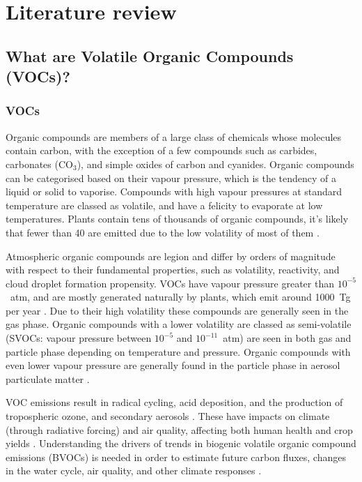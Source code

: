 
\chapter{Literature review} %
\label{ch_LitRev}

\section{What are Volatile Organic Compounds (VOCs)?}
\label{ch_LitRev:sec:what_are_vocs}
  \subsection{VOCs}
    Organic compounds are members of a large class of chemicals whose molecules contain carbon, with the exception of a few compounds such as carbides, carbonates (CO$_3$), and simple oxides of carbon and cyanides.
    Organic compounds can be categorised based on their vapour pressure, which is the tendency of a liquid or solid to vaporise.
    Compounds with high vapour pressures at standard temperature are classed as volatile, and have a felicity to evaporate at low temperatures.
    Plants contain tens of thousands of organic compounds, it's likely that fewer than 40 are emitted due to the low volatility of most of them \citep{Guenther2000}.
    
    Atmospheric organic compounds are legion and differ by orders of magnitude with respect to their fundamental properties, such as volatility, reactivity, and cloud droplet formation propensity.
    VOCs have vapour pressure greater than $10^{-5}$~atm, and are mostly generated naturally by plants, which emit around 1000~Tg per year \citep{Guenther1995, Glasius2016}.
    Due to their high volatility these compounds are generally seen in the gas phase.
    Organic compounds with a lower volatility are classed as semi-volatile (SVOCs: vapour pressure between $10^{-5}$ and $10^{-11}$~atm) are seen in both gas and particle phase depending on temperature and pressure.
    Organic compounds with even lower vapour pressure are generally found in the particle phase in aerosol particulate matter \citep{Glasius2016}.

    VOC emissions result in radical cycling, acid deposition, and the production of tropospheric ozone, and secondary aerosols \citep{Atkinson2000}.
    These have impacts on climate (through radiative forcing) and air quality, affecting both human health and crop yields \citep{IPCC_Chapter2, Avnery2011, Lelieveld2015}.
    Understanding the drivers of trends in biogenic volatile organic compound emissions (BVOCs) is needed in order to estimate future carbon fluxes, changes in the water cycle, air quality, and other climate responses \citep{Yue2015}.
    
